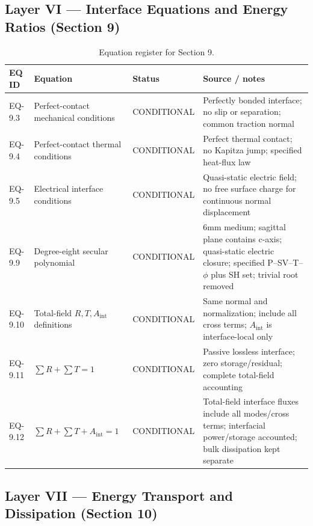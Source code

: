 \subsection{Layer VI — Interface Equations and Energy Ratios (Section 9)}

\begin{table}[htbp]
\centering
\small
\caption{Equation register for Section 9.}
\label{tab:appA-sec9}
\begin{tabularx}{\textwidth}{@{}p{1.6cm}Y p{2.8cm}Y@{}}
\toprule
\textbf{EQ ID} & \textbf{Equation} & \textbf{Status} & \textbf{Source / notes} \\
\midrule
EQ-9.3 & Perfect-contact mechanical conditions & CONDITIONAL & Perfectly bonded interface; no slip or separation; common traction normal \\
EQ-9.4 & Perfect-contact thermal conditions & CONDITIONAL & Perfect thermal contact; no Kapitza jump; specified heat-flux law \\
EQ-9.5 & Electrical interface conditions & CONDITIONAL & Quasi-static electric field; no free surface charge for continuous normal displacement \\
EQ-9.9 & Degree-eight secular polynomial & CONDITIONAL & 6mm medium; sagittal plane contains c-axis; quasi-static electric closure; specified P--SV--T--$\phi$ plus SH set; trivial root removed \\
EQ-9.10 & Total-field $R,T,A_{\mathrm{int}}$ definitions & CONDITIONAL & Same normal and normalization; include all cross terms; $A_{\mathrm{int}}$ is interface-local only \\
EQ-9.11 & $\sum R+\sum T=1$ & CONDITIONAL & Passive lossless interface; zero storage/residual; complete total-field accounting \\
EQ-9.12 & $\sum R+\sum T+A_{\mathrm{int}}=1$ & CONDITIONAL & Total-field interface fluxes include all modes/cross terms; interfacial power/storage accounted; bulk dissipation kept separate \\
\bottomrule
\end{tabularx}
\end{table}

\subsection{Layer VII — Energy Transport and Dissipation (Section 10)}

